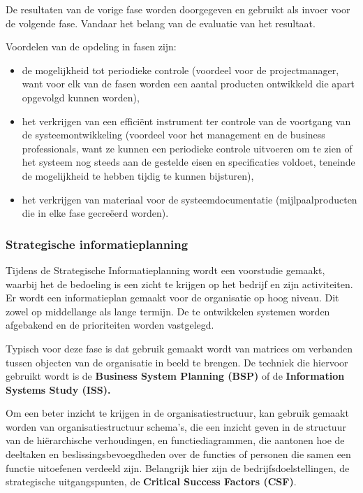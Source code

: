 De resultaten van de vorige fase worden doorgegeven en gebruikt als invoer voor de volgende fase. Vandaar het belang van de evaluatie van het resultaat.

Voordelen van de opdeling in fasen zijn:

\begin{itemize}
    \item de mogelijkheid tot periodieke controle (voordeel voor de projectmanager, want voor elk van de fasen worden een aantal producten ontwikkeld die apart opgevolgd kunnen worden),
    \item het verkrijgen van een efficiënt instrument ter controle van de voortgang van de systeemontwikkeling (voordeel voor het management en de business professionals, want ze kunnen een periodieke controle uitvoeren om te zien of het systeem nog steeds aan de gestelde eisen en specificaties voldoet, teneinde de mogelijkheid te hebben tijdig te kunnen bijsturen),
    \item het verkrijgen van materiaal voor de systeemdocumentatie (mijlpaalproducten die in elke fase gecreëerd worden).
\end{itemize}

\subsubsection{Strategische informatieplanning}

Tijdens de Strategische Informatieplanning wordt een voorstudie gemaakt, waarbij het de bedoeling is een zicht te krijgen op het bedrijf en zijn activiteiten. Er wordt een informatieplan gemaakt voor de organisatie op hoog niveau. Dit zowel op middellange als lange termijn. De te ontwikkelen systemen worden afgebakend en de prioriteiten worden vastgelegd.

Typisch voor deze fase is dat gebruik gemaakt wordt van matrices om verbanden tussen objecten van de organisatie in beeld te brengen. De techniek die hiervoor gebruikt wordt is de \textbf{Business System Planning (BSP)} of de \textbf{Information Systems Study (ISS).}
\newpage

Om een beter inzicht te krijgen in de organisatiestructuur, kan gebruik gemaakt worden van organisatiestructuur schema's, die een inzicht geven in de structuur van de hiërarchische verhoudingen, en functiediagrammen, die aantonen hoe de deeltaken en beslissingsbevoegdheden over de functies of personen die samen een functie uitoefenen verdeeld zijn. Belangrijk hier zijn de bedrijfsdoelstellingen, de strategische uitgangspunten, de \textbf{Critical Success Factors (CSF)}.

